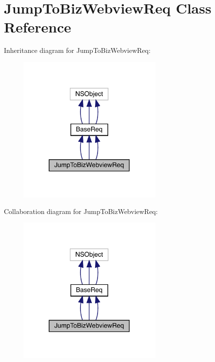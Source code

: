 \hypertarget{interface_jump_to_biz_webview_req}{}\section{Jump\+To\+Biz\+Webview\+Req Class Reference}
\label{interface_jump_to_biz_webview_req}


Inheritance diagram for Jump\+To\+Biz\+Webview\+Req\+:\nopagebreak
\begin{figure}[H]
\begin{center}
\leavevmode
\includegraphics[width=204pt]{interface_jump_to_biz_webview_req__inherit__graph}
\end{center}
\end{figure}


Collaboration diagram for Jump\+To\+Biz\+Webview\+Req\+:\nopagebreak
\begin{figure}[H]
\begin{center}
\leavevmode
\includegraphics[width=204pt]{interface_jump_to_biz_webview_req__coll__graph}
\end{center}
\end{figure}
